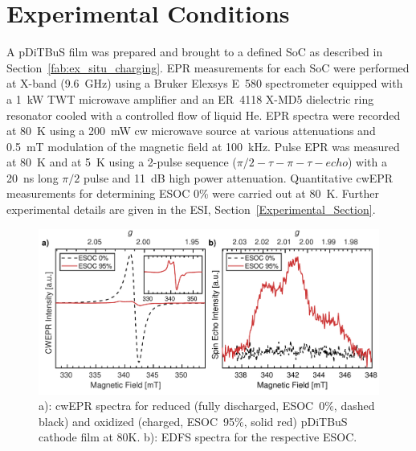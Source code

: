 \section{Experimental Conditions}
A pDiTBuS film was prepared and brought to a defined SoC as described in Section~\ref{fab:ex_situ_charging}. EPR measurements for each SoC were performed at X-band (9.6~GHz) using a Bruker Elexsys E~580 spectrometer equipped with a 1~kW TWT microwave amplifier and an ER~4118 X-MD5 dielectric ring resonator cooled with a controlled flow of liquid He. EPR spectra were recorded at 80~K using a 200~mW cw microwave source at various attenuations and 0.5~mT modulation of the magnetic field at 100~kHz. Pulse EPR was measured at 80~K and at 5~K using a 2-pulse sequence ($\pi/2-\tau-\pi-\tau-echo$) with a 20~ns long $\pi/2$ pulse and 11~dB high power attenuation. Quantitative cwEPR measurements for determining ESOC 0\% were carried out at 80~K. Further experimental details are given in the ESI, Section~\ref{Experimental_Section}.

\begin{figure}[ht]
\center
	\includegraphics[width=1\textwidth]{./pulse/figures/Figure_2.pdf}
	\caption{a): cwEPR spectra for reduced (fully discharged, ESOC~0$\%$, dashed black) and oxidized (charged, ESOC~95$\%$, solid red) pDiTBuS cathode film at 80K.  b): EDFS spectra for the respective ESOC.}
	\label{fig:Figure_2}
\end{figure}


